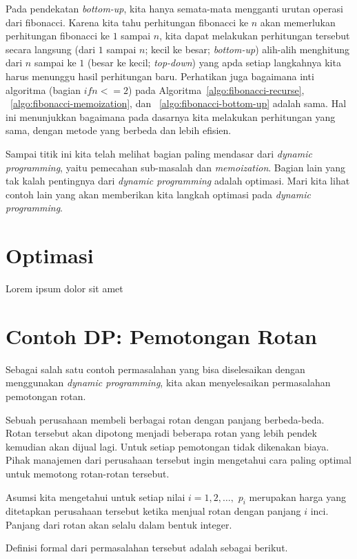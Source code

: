 Pada pendekatan \textit{bottom-up}, kita hanya semata-mata mengganti urutan operasi dari fibonacci. Karena kita tahu perhitungan fibonacci ke $n$ akan memerlukan perhitungan fibonacci ke $1$ sampai $n$, kita dapat melakukan perhitungan tersebut secara langsung (dari $1$ sampai $n$; kecil ke besar; \textit{bottom-up}) alih-alih menghitung dari $n$ sampai ke $1$ (besar ke kecil; \textit{top-down}) yang apda setiap langkahnya kita harus menunggu hasil perhitungan baru. Perhatikan juga bagaimana inti algoritma (bagian $if n <= 2$) pada Algoritma~\ref{algo:fibonacci-recurse}, ~\ref{algo:fibonacci-memoization}, dan ~\ref{algo:fibonacci-bottom-up} adalah sama. Hal ini menunjukkan bagaimana pada dasarnya kita melakukan perhitungan yang sama, dengan metode yang berbeda dan lebih efisien.

Sampai titik ini kita telah melihat bagian paling mendasar dari \textit{dynamic programming}, yaitu pemecahan sub-masalah dan \textit{memoization}. Bagian lain yang tak kalah pentingnya dari \textit{dynamic programming} adalah optimasi. Mari kita lihat contoh lain yang akan memberikan kita langkah optimasi pada \textit{dynamic programming}.

\section{Optimasi}

Lorem ipsum dolor sit amet

\section{Contoh DP: Pemotongan Rotan}
Sebagai salah satu contoh permasalahan yang bisa diselesaikan dengan menggunakan \textit{dynamic programming}, kita akan menyelesaikan permasalahan pemotongan rotan. 

Sebuah perusahaan membeli berbagai rotan dengan panjang berbeda-beda. Rotan tersebut akan dipotong menjadi beberapa rotan yang lebih pendek kemudian akan dijual lagi. Untuk setiap pemotongan tidak dikenakan biaya. Pihak manajemen dari perusahaan tersebut ingin mengetahui cara paling optimal untuk memotong rotan-rotan tersebut.

Asumsi kita mengetahui untuk setiap nilai $i=1,2,\ldots,$ $p_i$ merupakan harga yang ditetapkan perusahaan tersebut ketika menjual rotan dengan panjang $i$ inci. Panjang dari rotan akan selalu dalam bentuk integer. 

Definisi formal dari permasalahan tersebut adalah sebagai berikut.

